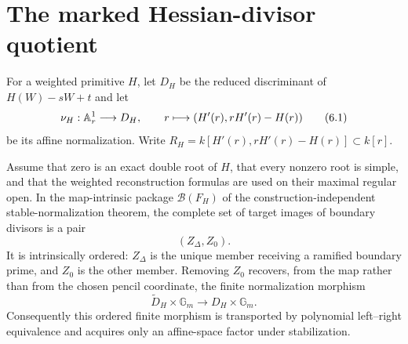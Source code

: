 \ifdefined\HurwitzLLPaper
\else

\section{The marked Hessian-divisor quotient}

For a weighted primitive $H$, let $D_H$ be the reduced discriminant of
$H(W)-sW+t$ and let
\[
 \nu_H:\mathbb A^1_r\longrightarrow D_H,
 \qquad r\longmapsto(H'(r),rH'(r)-H(r))                 \tag{6.1}
\]
be its affine normalization.  Write
$R_H=k[H'(r),rH'(r)-H(r)]\subset k[r]$.

\begin{proposition}
\label{prop:weighted-intrinsic-boundary}
Assume that zero is an exact double root of $H$, that every nonzero root is
simple, and that the weighted reconstruction formulas are used on their
maximal regular open.  In the map-intrinsic package
$\mathcal B(F_H)$ of the construction-independent stable-normalization
theorem, the complete set of
target images of boundary divisors is a pair
\[
 (Z_\Delta,Z_0).
\]
It is intrinsically ordered: $Z_\Delta$ is the unique member receiving a
ramified boundary prime, and $Z_0$ is the other member.  Removing $Z_0$
recovers, from the map rather than from the chosen pencil coordinate, the
finite normalization morphism
\[
 \widetilde D_H\times\mathbb G_m
 \longrightarrow D_H\times\mathbb G_m.                \tag{6.1a}
\]
Consequently this ordered finite morphism is transported by polynomial
left--right equivalence and acquires only an affine-space factor under
stabilization.
\end{proposition}

